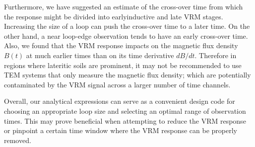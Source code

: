 \documentclass[onecolumn]{IEEEtran} %
\begin{document}
Furthermore, we have suggested an estimate of the cross-over time from which the response might be divided into earlyinductive and late VRM stages. Increasing the size of a loop can push the cross-over time to a later time. On the other hand, a near loop-edge observation tends to have an early cross-over time. Also, we found that the VRM response impacts on the magnetic flux density $B(t)$ at much earlier times than on its time derivative $dB/dt$. Therefore in regions where lateritic soils are prominent, it may not be recommended to use TEM systems that only measure the magnetic flux density; which are potentially contaminated by the VRM signal across a larger number of time channels.

Overall, our analytical expressions can serve as a convenient design code for choosing an appropriate loop size and selecting an optimal range of observation times. This may prove beneficial when attempting to reduce the VRM response or pinpoint a certain time window where the VRM response can be properly removed.





\end{document}
